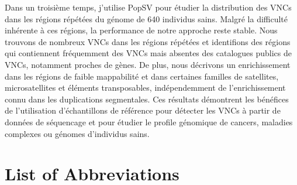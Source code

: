 Dans un troisième temps, j'utilise {\sf PopSV} pour étudier la distribution des VNCs dans les régions répétées du génome de 640 individus sains. 
Malgré la difficulté inhérente \`a ces régions, la performance de notre approche reste stable.
Nous trouvons de nombreux VNCs dans les régions répétées et identifions des régions qui contiennent fréquemment des VNCs mais absentes des catalogues publics de VNCs, notamment proches de gènes.
De plus, nous décrivons un enrichissement dans les régions de faible mappabilité et dans certaines familles de satellites, microsatellites et éléments transposables, indépendemment de l'enrichissement connu dans les duplications segmentales.
Ces résultats démontrent les bénéfices de l'utilisation d'échantillons de référence pour détecter les VNCs \`a partir de données de séquencage et pour étudier le profile génomique de cancers, maladies complexes ou génomes d'individus sains.

\singlespacing

\newpage

\hypersetup{linkcolor=black}

\tableofcontents

\newpage

\section*{List of Abbreviations}

